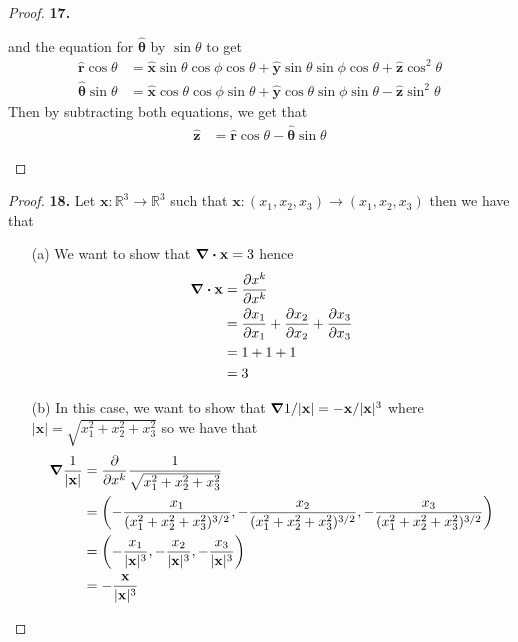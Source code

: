 \documentclass[11pt]{article}
\newcommand{\R}{\mathbb{R}}
\newcommand{\hatx}{\bm{\hat{x}}}
\newcommand{\haty}{\bm{\hat{y}}}
\newcommand{\hatz}{\bm{\hat{z}}}
\newcommand{\hatr}{\bm{\hat{r}}}
\newcommand{\hattheta}{\bm{\hat{\theta}}}
\theoremstyle{definition}
\begin{document}
\begin{proof}{\textbf{17.}}
\begin{itemize}
    and the equation for $\hattheta$ by $\sin\theta$ to get
    \begin{align*}
        \hatr\cos\theta &=
        \hatx\sin\theta\cos\phi\cos\theta
        + \haty\sin\theta\sin\phi\cos\theta + \hatz\cos^2\theta\\
        \hattheta\sin\theta &= 
            \hatx\cos\theta\cos\phi\sin\theta
            + \haty\cos\theta\sin\phi\sin\theta - \hatz\sin^2\theta
    \end{align*}
    Then by subtracting both equations, we get that
    \begin{align*}
        \hatz &= \hatr\cos\theta - \hattheta\sin\theta
    \end{align*}
\end{itemize}
\end{proof}
\cleardoublepage
\begin{proof}{\textbf{18.}}
    Let $\mathbf{x}: \R^3 \to \R^3$ such that
    $\mathbf{x}: (x_1, x_2, x_3) \to (x_1, x_2, x_3)$ then we have that
    \begin{itemize}
    \item [(a)] We want to show that $\divergence\mathbf{x} = 3$ hence
    \begin{align*}
        \divergence\mathbf{x} &= \partialderivative{x^k}{x^k}\\
            &= \partialderivative{x_1}{x_1} +
            \partialderivative{x_2}{x_2} +
            \partialderivative{x_3}{x_3}\\
            &= 1 + 1 + 1\\
            &= 3
    \end{align*}
    \item [(b)] In this case, we want to show that
    $\gradient 1/|\mathbf{x}| = -\mathbf{x}/|\mathbf{x}|^3$ where
    $|\mathbf{x}| = \sqrt{x_1^2 + x_2^2 + x_3^2}$ so we have that
    \begin{align*}
        \gradient \frac{1}{|\mathbf{x}|}
            &= \partialderivative{}{x^k}\frac{1}{\sqrt{x_1^2 + x_2^2 + x_3^2}}\\
            &= \left(-\frac{x_1}{(x_1^2 + x_2^2 + x_3^2)^{3/2}},
             -\frac{x_2}{(x_1^2 + x_2^2 + x_3^2)^{3/2}},
            -\frac{x_3}{(x_1^2 + x_2^2 + x_3^2)^{3/2}}\right)\\
            &= \left(-\frac{x_1}{|\mathbf{x}|^3},
             -\frac{x_2}{|\mathbf{x}|^3},
            -\frac{x_3}{|\mathbf{x}|^3}\right)\\
            &= -\frac{\mathbf{x}}{|\mathbf{x}|^3}
    \end{align*}

\end{itemize}
\end{proof}
\end{document}
